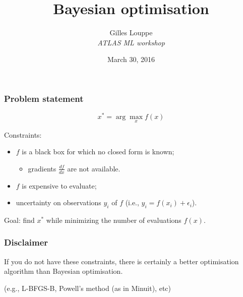 \documentclass{beamer}
\title{{\bf Bayesian optimisation}}
\author{
Gilles Louppe\\
{\it ATLAS ML workshop}
}
\date{March 30, 2016}
\begin{document}
\begin{frame}[plain]
\titlepage
\end{frame}

\begin{frame}
    \frametitle{Problem statement}

    \begin{center}
        $$x^* = \arg \max_x f(x)$$
    \end{center}

    \vspace{2em}

    Constraints:
    \begin{itemize}
        \item $f$ is a black box for which no closed form is known;
            \begin{itemize}
                \item gradients $\frac{df}{dx}$ are not available.
            \end{itemize}

        \item $f$ is expensive to evaluate;

        \item uncertainty on observations $y_i$ of $f$ (i.e., $y_i = f(x_i) + \epsilon_i$).
    \end{itemize}

    \vspace{2em}

    Goal: find $x^*$ while minimizing the number of evaluations $f(x)$.
\end{frame}

\begin{frame}
    \frametitle{\color{red} Disclaimer}
    \begin{center}
        If you do not have these constraints, there is certainly a better optimisation algorithm than Bayesian optimisation.

        \vspace{3em}

        (e.g., L-BFGS-B, Powell's method (as in Minuit), etc)
    \end{center}
\end{frame}
\end{document}
